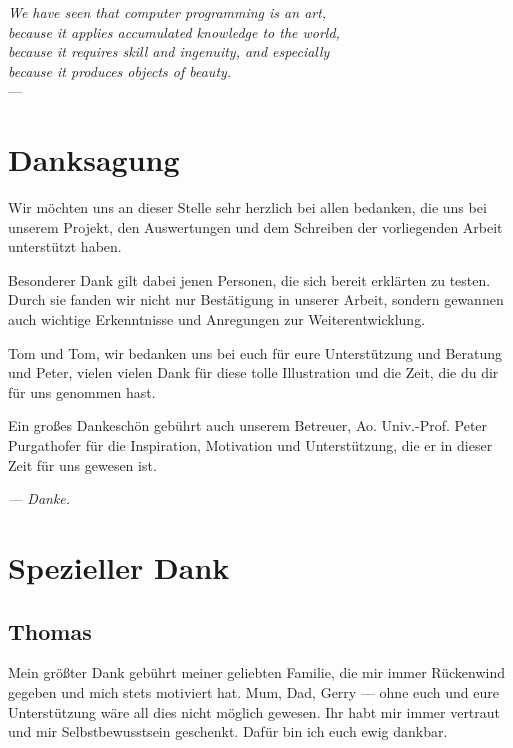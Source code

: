 
\begin{flushright}{\slshape    
    We have seen that computer programming is an art, \\ 
    because it applies accumulated knowledge to the world, \\ 
    because it requires skill and ingenuity, and especially \\
    because it produces objects of beauty.} \\ \medskip
    ---  \citep{knuth:1974}
\end{flushright}

\bigskip

\begingroup
\let\clearpage\relax
\let\cleardoublepage\relax
\let\cleardoublepage\relax
\chapter*{Danksagung}
Wir möchten uns an dieser Stelle sehr herzlich bei allen bedanken, die uns bei unserem Projekt, den Auswertungen und dem Schreiben der vorliegenden Arbeit unterstützt haben. 

Besonderer Dank gilt dabei jenen Personen, die sich bereit erklärten \scribbler zu testen. Durch sie fanden wir nicht nur Bestätigung in unserer Arbeit, sondern gewannen auch wichtige Erkenntnisse und Anregungen zur Weiterentwicklung.

Tom und Tom, wir bedanken uns bei euch für eure Unterstützung und Beratung und Peter, vielen vielen Dank für diese tolle Illustration und die Zeit, die du dir für uns genommen hast.

Ein großes Dankeschön gebührt auch unserem Betreuer, Ao. Univ.-Prof. Peter Purgathofer für die Inspiration, Motivation und Unterstützung, die er in dieser Zeit für uns gewesen ist.

\medskip \noindent \emph{--- Danke.}

\pagebreak

\chapter*{Spezieller Dank}

\section*{Thomas}
Mein größter Dank gebührt meiner geliebten Familie, die mir immer Rückenwind gegeben und mich stets motiviert hat. Mum, Dad, Gerry --- ohne euch und eure Unterstützung wäre all dies nicht möglich gewesen. Ihr habt mir immer vertraut und mir Selbstbewusstsein geschenkt. Dafür bin ich euch ewig dankbar.

